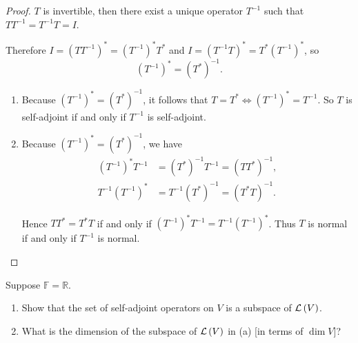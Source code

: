 \begin{proof}
    $T$ is invertible, then there exist a unique operator $T^{-1}$ such that $TT^{-1} = T^{-1}T = I$.

    Therefore $I = {(TT^{-1})}^{*} = {(T^{-1})}^{*}T^{*}$ and $I = {(T^{-1}T)}^{*} = T^{*}{(T^{-1})}^{*}$, so
    \[
        {(T^{-1})}^{*} = {(T^{*})}^{-1}.
    \]

    \begin{enumerate}[label={(\alph*)}]
        \item Because ${(T^{-1})}^{*} = {(T^{*})}^{-1}$, it follows that $T = T^{*} \Longleftrightarrow {(T^{-1})}^{*} = T^{-1}$. So $T$ is self-adjoint if and only if $T^{-1}$ is self-adjoint.
        \item Because ${(T^{-1})}^{*} = {(T^{*})}^{-1}$, we have
        \begin{align*}
            {(T^{-1})}^{*}T^{-1} & = {(T^{*})}^{-1}T^{-1} = {(TT^{*})}^{-1}, \\
            T^{-1}{(T^{-1})}^{*} & = T^{-1}{(T^{*})}^{-1} = {(T^{*}T)}^{-1}.
        \end{align*}

        Hence $TT^{*} = T^{*}T$ if and only if ${(T^{-1})}^{*}T^{-1} = T^{-1}{(T^{-1})}^{*}$. Thus $T$ is normal if and only if $T^{-1}$ is normal.
    \end{enumerate}
\end{proof}
\newpage

\begin{exercise}
    Suppose $\mathbb{F} = \mathbb{R}$.
    \begin{enumerate}[label={(\alph*)}]
        \item Show that the set of self-adjoint operators on $V$ is a subspace of $\mathcal{L}\left({V}\right)$.
        \item What is the dimension of the subspace of $\mathcal{L}\left({V}\right)$ in (a) [in terms of $\dim V$]?
    \end{enumerate}
\end{exercise}

